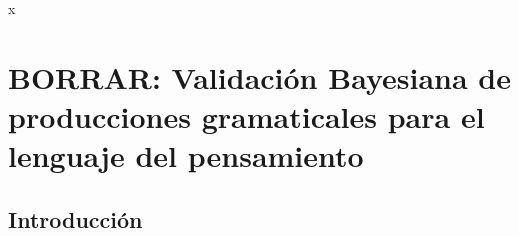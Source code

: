 x

\chapter{BORRAR: Validación Bayesiana de producciones gramaticales para el lenguaje del pensamiento}

\section{Introducción}


